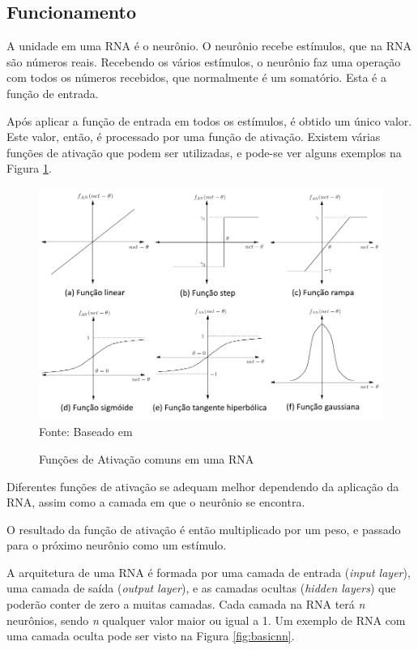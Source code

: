 \documentclass[
	12pt,					%
	openright,				%
	oneside,				%
	a4paper,				%
	bibjustif,				%
	chapter=TITLE,			%
	english,				%
	brazil,					%
	]{abntex2}
\newcommand{\source}[1]{\small Fonte: {#1}}
\begin{document}
	\subsection{Funcionamento}
	A unidade em uma RNA é o neurônio.
	O neurônio recebe estímulos, que na RNA são números reais.
	Recebendo os vários estímulos, o neurônio faz uma operação com todos os números recebidos,
	que normalmente é um somatório.
	Esta é a função de entrada.
	
	Após aplicar a função de entrada em todos os estímulos,
	é obtido um único valor.
	Este valor, então, é processado por uma função de ativação.
	Existem várias funções de ativação que podem ser utilizadas,
	e pode-se ver alguns exemplos na Figura \ref{fig:activationFunctions}.
	
	\begin{figure}[ht!]
		\caption{Funções de Ativação comuns em uma RNA}
		\centering
		\includegraphics[scale=0.48]{img/ActivationFunctions.png}\\
		\vspace{0.5mm}
		\source{Baseado em }
		\label{fig:activationFunctions}
	\end{figure}
	
	Diferentes funções de ativação se adequam melhor dependendo da aplicação da RNA,
	assim como a camada em que o neurônio se encontra.
	
	O resultado da função de ativação é então multiplicado por um peso,
	e passado para o próximo neurônio como um estímulo.
	
	A arquitetura de uma RNA é formada por uma camada de entrada (\textit{input layer}),
	uma camada de saída (\textit{output layer}),
	e as camadas ocultas (\textit{hidden layers})
	que poderão conter de zero a muitas camadas.
	Cada camada na RNA terá \textit{n} neurônios,
	sendo \textit{n} qualquer valor maior ou igual a 1.
	Um exemplo de RNA com uma camada oculta pode ser visto na Figura \ref{fig:basicnn}.
	
\end{document}

